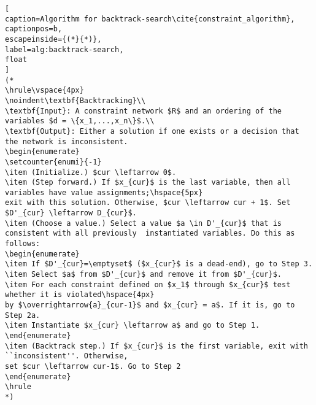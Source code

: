 \begin{lstlisting}[
caption=Algorithm for backtrack-search\cite{constraint_algorithm}, 
captionpos=b, 
escapeinside={(*}{*)}, 
label=alg:backtrack-search,
float
]
(*
\hrule\vspace{4px}
\noindent\textbf{Backtracking}\\
\textbf{Input}: A constraint network $R$ and an ordering of the variables $d = \{x_1,...,x_n\}$.\\
\textbf{Output}: Either a solution if one exists or a decision that the network is inconsistent.
\begin{enumerate}
\setcounter{enumi}{-1}
\item (Initialize.) $cur \leftarrow 0$.
\item (Step forward.) If $x_{cur}$ is the last variable, then all variables have value assignments;\hspace{5px}
exit with this solution. Otherwise, $cur \leftarrow cur + 1$. Set $D'_{cur} \leftarrow D_{cur}$.
\item (Choose a value.) Select a value $a \in D'_{cur}$ that is consistent with all previously  instantiated variables. Do this as follows:
\begin{enumerate} 
\item If $D'_{cur}=\emptyset$ ($x_{cur}$ is a dead-end), go to Step 3.
\item Select $a$ from $D'_{cur}$ and remove it from $D'_{cur}$.
\item For each constraint defined on $x_1$ through $x_{cur}$ test whether it is violated\hspace{4px}
by $\overrightarrow{a}_{cur-1}$ and $x_{cur} = a$. If it is, go to Step 2a.
\item Instantiate $x_{cur} \leftarrow a$ and go to Step 1.
\end{enumerate}
\item (Backtrack step.) If $x_{cur}$ is the first variable, exit with ``inconsistent''. Otherwise,
set $cur \leftarrow cur-1$. Go to Step 2
\end{enumerate}
\hrule
*)
\end{lstlisting}